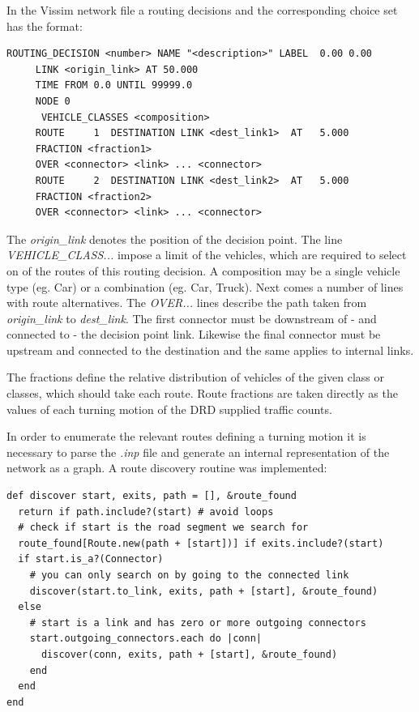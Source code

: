 In the Vissim network file a routing decisions and the corresponding choice set has the format:

\begin{verbatim}
ROUTING_DECISION <number> NAME "<description>" LABEL  0.00 0.00
     LINK <origin_link> AT 50.000
     TIME FROM 0.0 UNTIL 99999.0
     NODE 0
      VEHICLE_CLASSES <composition>
     ROUTE     1  DESTINATION LINK <dest_link1>  AT   5.000
     FRACTION <fraction1>
     OVER <connector> <link> ... <connector>
     ROUTE     2  DESTINATION LINK <dest_link2>  AT   5.000
     FRACTION <fraction2>
     OVER <connector> <link> ... <connector>
\end{verbatim}

The \textit{origin\_link} denotes the position of the decision point. The line \textit{VEHICLE\_CLASS...} impose a limit of the vehicles, which are required to select on of the routes of this routing decision. A composition may be a single vehicle type (eg. Car) or a combination (eg. Car, Truck). Next comes a number of lines with route alternatives. The \textit{OVER...} lines describe the path taken from \textit{origin\_link} to \textit{dest\_link}. The first connector must be downstream of - and connected to - the decision point link. Likewise the final connector must be upstream and connected to the destination and the same applies to internal links.

The fractions define the relative distribution of vehicles of the given class or classes, which should take each route. Route fractions are taken directly as the values of each turning motion of the DRD supplied traffic counts.

In order to enumerate the relevant routes defining a turning motion it is necessary to parse the \textit{.inp} file and generate an internal representation of the network as a graph. A route discovery routine was implemented:

\begin{verbatim}
def discover start, exits, path = [], &route_found
  return if path.include?(start) # avoid loops
  # check if start is the road segment we search for
  route_found[Route.new(path + [start])] if exits.include?(start)
  if start.is_a?(Connector)
    # you can only search on by going to the connected link
    discover(start.to_link, exits, path + [start], &route_found)
  else
    # start is a link and has zero or more outgoing connectors 
    start.outgoing_connectors.each do |conn|
      discover(conn, exits, path + [start], &route_found)
    end
  end
end
\end{verbatim}

